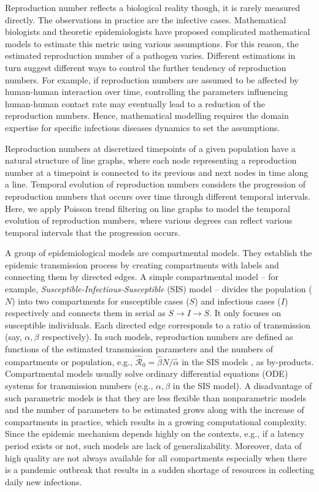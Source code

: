 \documentclass[10pt,letterpaper]{article}
\def\calR{\mathcal{R}}
\begin{document}
Reproduction number reflects a biological reality though, it is rarely measured directly. The observations in practice are the infective cases. Mathematical biologists and theoretic epidemiologists have proposed complicated mathematical models to estimate this metric using various assumptions. For this reason, the estimated reproduction number of a pathogen varies. Different estimations in turn suggest different ways to control the further tendency of reproduction numbers. For example, if reproduction numbers are assumed to be affected by human-human interaction over time, controlling the parameters influencing human-human contact rate may eventually lead to a reduction of the reproduction numbers. Hence, mathematical modelling requires the domain expertise for specific infectious diseases dynamics to set the assumptions. %

Reproduction numbers at discretized timepoints of a given population have a natural structure of line graphs, where each node representing a reproduction number at a timepoint is connected to its previous and next nodes in time along a line. Temporal evolution of reproduction numbers considers the progression of reproduction numbers that occurs over time through different temporal intervals. Here, we apply Poisson trend filtering on line graphs to model the temporal evolution of reproduction numbers, where various degrees can reflect various temporal intervals that the progression occurs. 

A group of epidemiological models are compartmental models. They establish the epidemic transmission process by creating compartments with labels and connecting them by directed edges. A simple compartmental model -- for example, \textit{Susceptible-Infectious-Susceptible} (SIS) model -- divides the population ($N$) into two compartments for susceptible cases ($S$) and infectious cases ($I$) respectively and connects them in serial as $S\to I\to S$. It only focuses on susceptible individuals. Each directed edge corresponds to a ratio of transmission (say, $\alpha,\beta$ respectively). In such models, reproduction numbers are defined as functions of the estimated transmission parameters and the numbers of compartments or population, e.g., $\hat{\calR}_0=\hat{\beta} N/\hat{\alpha}$ in the SIS models \cite{brauer2019mathematical}, as by-products. Compartmental models usually solve ordinary differential equations (ODE) systems for transmission numbers (e.g., $\alpha,\beta$ in the SIS model). A disadvantage of such parametric models is that they are less flexible than nonparametric models and the number of parameters to be estimated grows along with the increase of compartments in practice, which results in a growing computational complexity. Since the epidemic mechanism depends highly on the contexts, e.g., if a latency period exists or not, such models are lack of generalizability. Moreover, data of high quality are not always available for all compartments especially when there is a pandemic outbreak that results in a sudden shortage of resources in collecting daily new infections. %
\end{document}

